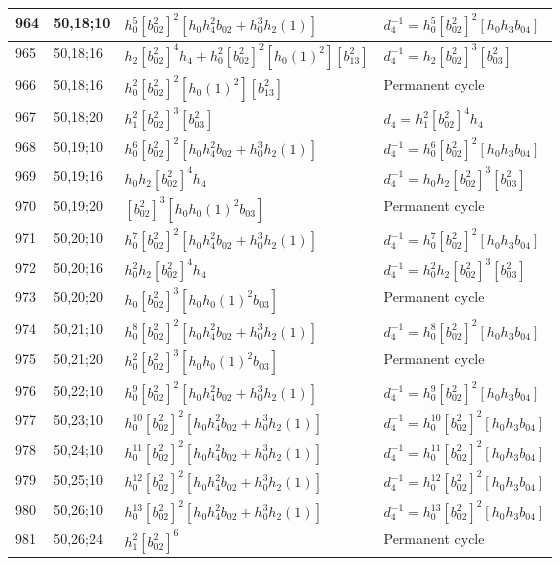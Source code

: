 \documentclass{article}
\begin{document}
\begin{longtable}{|l|l|>{\raggedright\arraybackslash}p{6cm}|>{\raggedright\arraybackslash}p{6cm}|}
\hline
964 & 50,18;10 & $h_0^5[b_{02}^2]^2[h_0h_4^2b_{02} + h_0^3h_2(1)]$ & $d_{4}^{-1}=h_0^5[b_{02}^2]^2[h_0h_3b_{04}]$\\
\hline
965 & 50,18;16 & $h_2[b_{02}^2]^4h_4 + h_0^2[b_{02}^2]^2[h_0(1)^2][b_{13}^2]$ & $d_{4}^{-1}=h_2[b_{02}^2]^3[b_{03}^2]$\\
966 & 50,18;16 & $h_0^2[b_{02}^2]^2[h_0(1)^2][b_{13}^2]$ & Permanent cycle\\
\hline
967 & 50,18;20 & $h_1^2[b_{02}^2]^3[b_{03}^2]$ &$d_{4}=h_1^2[b_{02}^2]^4h_4$\\
\hline
968 & 50,19;10 & $h_0^6[b_{02}^2]^2[h_0h_4^2b_{02} + h_0^3h_2(1)]$ & $d_{4}^{-1}=h_0^6[b_{02}^2]^2[h_0h_3b_{04}]$\\
\hline
969 & 50,19;16 & $h_0h_2[b_{02}^2]^4h_4$ & $d_{4}^{-1}=h_0h_2[b_{02}^2]^3[b_{03}^2]$\\
\hline
970 & 50,19;20 & $[b_{02}^2]^3[h_0h_0(1)^2b_{03}]$ & Permanent cycle\\
\hline
971 & 50,20;10 & $h_0^7[b_{02}^2]^2[h_0h_4^2b_{02} + h_0^3h_2(1)]$ & $d_{4}^{-1}=h_0^7[b_{02}^2]^2[h_0h_3b_{04}]$\\
\hline
972 & 50,20;16 & $h_0^2h_2[b_{02}^2]^4h_4$ & $d_{4}^{-1}=h_0^2h_2[b_{02}^2]^3[b_{03}^2]$\\
\hline
973 & 50,20;20 & $h_0[b_{02}^2]^3[h_0h_0(1)^2b_{03}]$ & Permanent cycle\\
\hline
974 & 50,21;10 & $h_0^8[b_{02}^2]^2[h_0h_4^2b_{02} + h_0^3h_2(1)]$ & $d_{4}^{-1}=h_0^8[b_{02}^2]^2[h_0h_3b_{04}]$\\
\hline
975 & 50,21;20 & $h_0^2[b_{02}^2]^3[h_0h_0(1)^2b_{03}]$ & Permanent cycle\\
\hline
976 & 50,22;10 & $h_0^9[b_{02}^2]^2[h_0h_4^2b_{02} + h_0^3h_2(1)]$ & $d_{4}^{-1}=h_0^9[b_{02}^2]^2[h_0h_3b_{04}]$\\
\hline
977 & 50,23;10 & $h_0^{10}[b_{02}^2]^2[h_0h_4^2b_{02} + h_0^3h_2(1)]$ & $d_{4}^{-1}=h_0^{10}[b_{02}^2]^2[h_0h_3b_{04}]$\\
\hline
978 & 50,24;10 & $h_0^{11}[b_{02}^2]^2[h_0h_4^2b_{02} + h_0^3h_2(1)]$ & $d_{4}^{-1}=h_0^{11}[b_{02}^2]^2[h_0h_3b_{04}]$\\
\hline
979 & 50,25;10 & $h_0^{12}[b_{02}^2]^2[h_0h_4^2b_{02} + h_0^3h_2(1)]$ & $d_{4}^{-1}=h_0^{12}[b_{02}^2]^2[h_0h_3b_{04}]$\\
\hline
980 & 50,26;10 & $h_0^{13}[b_{02}^2]^2[h_0h_4^2b_{02} + h_0^3h_2(1)]$ & $d_{4}^{-1}=h_0^{13}[b_{02}^2]^2[h_0h_3b_{04}]$\\
\hline
981 & 50,26;24 & $h_1^2[b_{02}^2]^6$ & Permanent cycle\\

\end{longtable}
\end{document}

